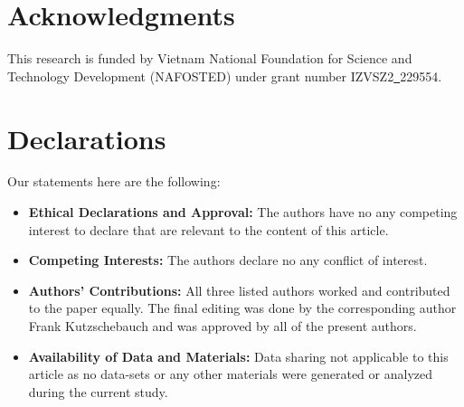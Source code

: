 \documentclass{amsart}
\theoremstyle{definition}
\begin{document}
	
	
	
	
	
	\section*{Acknowledgments}
	
	This research is funded by Vietnam National Foundation for Science and Technology Development (NAFOSTED) under grant number IZVSZ2\underline{~}229554.
	
	
	
	
	
	
	\section*{Declarations}
	
	Our statements here are the following:
	
	\begin{itemize}
		\item {\bf Ethical Declarations and Approval:} The authors have no any competing interest to declare that are relevant to the content of this article.
		\item {\bf Competing Interests:} The authors declare no any conflict of interest.
		\item  {\bf Authors' Contributions:} All three listed authors worked and contributed to the paper equally. The final editing was done by the corresponding author Frank Kutzschebauch and was approved by all of the present authors.
		\item {\bf Availability of Data and Materials:} Data sharing not applicable to this article as no data-sets or any other materials were generated or analyzed during the current study.
	\end{itemize}
	
	
	
	
	
	
	
	
	
	
\end{document}

